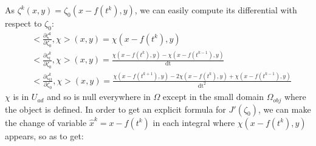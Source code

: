 \documentclass[11pt,a4paper]{article}
\begin{document}
		As $\zeta^k(x,y) = \zeta_0(x-f(t^k),y)$, we can easily compute its differential with respect to $\zeta_0$:
		\begin{align*}
			& <\!\frac{\partial\zeta^k}{\partial \zeta_0}, \chi\!>(x,y) = \chi(x-f(t^k),y)\\
			& <\!\frac{\partial\zeta_t^k}{\partial \zeta_0}, \chi\!>(x,y) = \frac{\chi(x-f(t^k),y) - \chi(x-f(t^{k-1}),y)}{\mathrm{dt}} \\
			& <\!\frac{\partial\zeta_{tt}^k}{\partial \zeta_0}, \chi\!>(x,y) = \frac{\chi(x-f(t^{k+1}),y) - 2\chi(x-f(t^{k}),y)+\chi(x-f(t^{k-1}),y)}{\mathrm{dt}^2} 
		\end{align*}
		$\chi$ is in $U_{ad}$ and so is null everywhere in $\Omega$ except in the small domain $\Omega_{obj}$ where the object is defined. In order to get an explicit formula for $J'(\zeta_0)$, we can make the change of variable $ \hat{x}^k = x - f(t^k)$ in each integral where $\chi(x-f(t^k),y)$ appears, so as to get:
\end{document}
